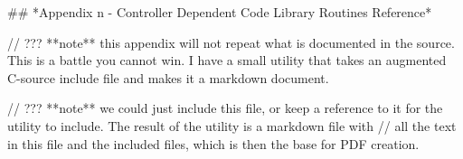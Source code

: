 ## *Appendix n - Controller Dependent Code Library Routines Reference*

// ??? **note** this appendix will not repeat what is documented in the source. This is a battle you cannot win. I have a small utility that takes an augmented C-source include file and makes it a markdown document. 

// ??? **note** we could just include this file, or keep a reference to it for the utility to include. The result of the utility is a markdown file with
// all the text in this file and the included files, which is then the base for PDF creation.
